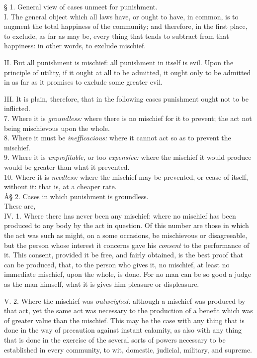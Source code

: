 \documentclass[12pt]{report}
\begin{document}
§ 1. General view of cases unmeet for punishment.\\
I. The general object which all laws have, or ought to have, in common,
is to augment the total happiness of the community; and therefore, in
the first place, to exclude, as far as may be, every thing that tends to
subtract from that happiness: in other words, to exclude mischief.

II. But all punishment is mischief: all punishment in itself is evil.
Upon the principle of utility, if it ought at all to be admitted, it
ought only to be admitted in as far as it promises to exclude some
greater evil.

III. It is plain, therefore, that in the following cases punishment
ought not to be inflicted.\\
7. Where it is \emph{groundless:} where there is no mischief for it to
prevent; the act not being mischievous upon the whole.\\
8. Where it must be \emph{inefficacious:} where it cannot act so as to
prevent the mischief.\\
9. Where it is \emph{unprofitable,} or too \emph{expensive:} where the
mischief it would produce would be greater than what it prevented.\\
10. Where it is \emph{needless:} where the mischief may be prevented, or
cease of itself, without it: that is, at a cheaper rate.\\

Â§ 2. Cases in which punishment is groundless.\\
These are,\\
IV. 1. Where there has never been any mischief: where no mischief has
been produced to any body by the act in question. Of this number are
those in which the act was such as might, on a some occasions, be
mischievous or disagreeable, but the person whose interest it concerns
gave his \emph{consent} to the performance of it. This consent, provided
it be free, and fairly obtained, is the best proof that can be produced,
that, to the person who gives it, no mischief, at least no immediate
mischief, upon the whole, is done. For no man can be so good a judge as
the man himself, what it is gives him pleasure or displeasure.

V. 2. Where the mischief was \emph{outweighed:} although a mischief was
produced by that act, yet the same act was necessary to the production
of a benefit which was of greater value than the mischief. This may be
the case with any thing that is done in the way of precaution against
instant calamity, as also with any thing that is done in the exercise of
the several sorts of powers necessary to be established in every
community, to wit, domestic, judicial, military, and supreme.
\end{document}
